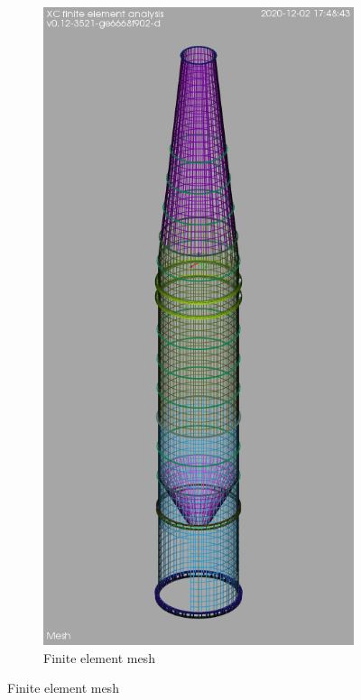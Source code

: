 \documentclass[a4paper,11pt ]{xc_webpage_project}
\begin{document}
\begin{figure}[h]
\begin{subfigure}[b]{0.35\textwidth}
  \includegraphics[width=\textwidth]{figures/model02}
  \caption{Finite element mesh}
  \end{subfigure}
  \end{figure}
\end{document}
